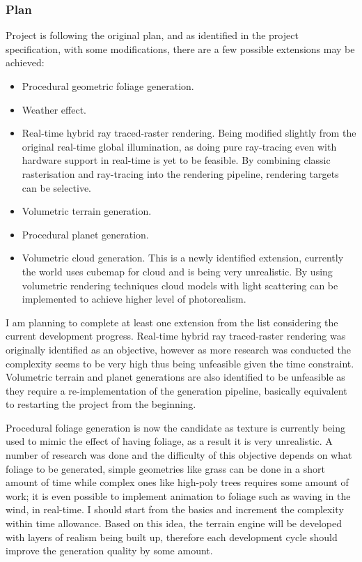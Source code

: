 \documentclass[oneside, a4paper]{article}
\begin{document}

    \subsubsection{Plan}

    Project is following the original plan, and as identified in the project specification, with some modifications, there are a few possible extensions may be achieved:

    \begin{itemize}[label=\(\diamond\)]
        \item Procedural geometric foliage generation.
        \item Weather effect.
        \item Real-time hybrid ray traced-raster rendering. Being modified slightly from the original real-time global illumination, as doing pure ray-tracing even with hardware support in real-time is yet to be feasible. By combining classic rasterisation and ray-tracing into the rendering pipeline, rendering targets can be selective.
        \item Volumetric terrain generation.
        \item Procedural planet generation.
        \item Volumetric cloud generation. This is a newly identified extension, currently the world uses cubemap for cloud and is being very unrealistic. By using volumetric rendering techniques cloud models with light scattering can be implemented to achieve higher level of photorealism.
    \end{itemize}

    I am planning to complete at least one extension from the list considering the current development progress. Real-time hybrid ray traced-raster rendering was originally identified as an objective, however as more research was conducted the complexity seems to be very high thus being unfeasible given the time constraint. Volumetric terrain and planet generations are also identified to be unfeasible as they require a re-implementation of the generation pipeline, basically equivalent to restarting the project from the beginning.

    Procedural foliage generation is now the candidate as texture is currently being used to mimic the effect of having foliage, as a result it is very unrealistic. A number of research was done and the difficulty of this objective depends on what foliage to be generated, simple geometries like grass can be done in a short amount of time while complex ones like high-poly trees requires some amount of work; it is even possible to implement animation to foliage such as waving in the wind, in real-time. I should start from the basics and increment the complexity within time allowance. Based on this idea, the terrain engine will be developed with layers of realism being built up, therefore each development cycle should improve the generation quality by some amount.
\end{document}
